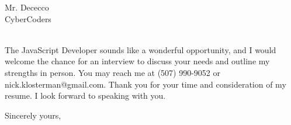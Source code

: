 \documentclass{letter} %
\makeatletter
\newcommand{\contactperson}{Mr. Dececco}
\newcommand{\contactCompany}{CyberCoders}
\newcommand{\contactStreetAddress}{ }  %
\newcommand{\contactCityStateZip}{ }
\newcommand{\position}{JavaScript Developer }%
\newcommand{\personalphonenumber}{(507) 990-9052 }
\newcommand{\personalemail}{nick.klosterman@gmail.com}
\makeatother
\begin{document}
\begin{letter}{\contactperson \\
\contactCompany \\
\contactStreetAddress \\
\contactCityStateZip

}
 
\noindent 
The \position sounds like a wonderful opportunity, and I would welcome the chance for an interview to discuss your needs and outline my strengths in person. 
You may reach me at \personalphonenumber or \personalemail.
Thank you for your time and consideration of my resume. I look forward to speaking with you.
 

\closing{Sincerely yours,} 
 

 

\end{letter}
 
\end{document}
